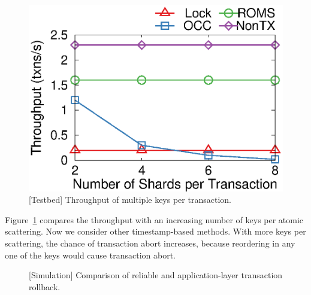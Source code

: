 

\begin{figure}[t]
\centering
\includegraphics[width=.35\textwidth]{gnuplot/multishard.eps}
\caption{[Testbed] Throughput of multiple keys per transaction.}
\label{fig:multishard}
\vspace{-10pt}
\end{figure}

Figure~\ref{fig:multishard} compares the throughput with an increasing number of keys per atomic scattering.
Now we consider other timestamp-based methods.
With more keys per scattering, the chance of transaction abort increases, because reordering in any one of the keys would cause transaction abort.




\begin{figure}[t]
\centering
	\hspace{0.01\textwidth}
\caption{[Simulation] Comparison of reliable \sys and application-layer transaction rollback.}
\label{fig:ycsb-loss}
\end{figure}

